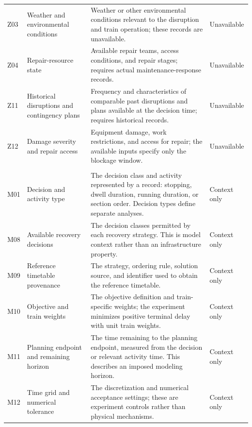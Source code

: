 \begin{longtable}{@{}>{\raggedright\arraybackslash}p{0.7cm}>{\raggedright\arraybackslash}p{3.0cm}>{\raggedright\arraybackslash}p{8.6cm}>{\raggedright\arraybackslash}p{1.9cm}@{}}
Z03 & Weather and environmental conditions & Weather or other environmental conditions relevant to the disruption and train operation; these records are unavailable. & Unavailable \\

Z04 & Repair-resource state & Available repair teams, access conditions, and repair stages; requires actual maintenance-response records. & Unavailable \\

Z11 & Historical disruptions and contingency plans & Frequency and characteristics of comparable past disruptions and plans available at the decision time; requires historical records. & Unavailable \\

Z12 & Damage severity and repair access & Equipment damage, work restrictions, and access for repair; the available inputs specify only the blockage window. & Unavailable \\

\multicolumn{4}{@{}l}{\textbf{Timetable characteristics}}\\*[2pt]

M01 & Decision and activity type & The decision class and activity represented by a record: stopping, dwell duration, running duration, or section order. Decision types define separate analyses. & Context only \\

M08 & Available recovery decisions & The decision classes permitted by each recovery strategy. This is model context rather than an infrastructure property. & Context only \\

M09 & Reference timetable provenance & The strategy, ordering rule, solution source, and identifier used to obtain the reference timetable. & Context only \\

M10 & Objective and train weights & The objective definition and train-specific weights; the experiment minimizes positive terminal delay with unit train weights. & Context only \\

M11 & Planning endpoint and remaining horizon & The time remaining to the planning endpoint, measured from the decision or relevant activity time. This describes an imposed modeling horizon. & Context only \\

M12 & Time grid and numerical tolerance & The discretization and numerical acceptance settings; these are experiment controls rather than physical mechanisms. & Context only \\


\end{longtable}
